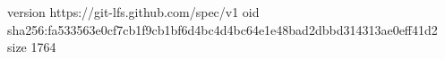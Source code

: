 version https://git-lfs.github.com/spec/v1
oid sha256:fa533563e0cf7cb1f9cb1bf6d4bc4d4bc64e1e48bad2dbbd314313ae0eff41d2
size 1764
